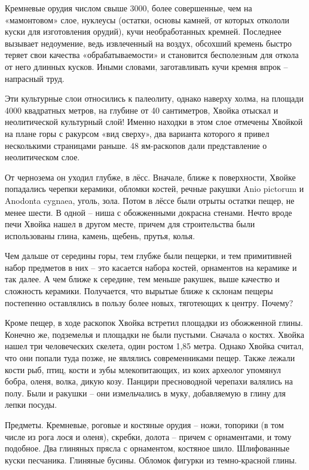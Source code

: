 Кремневые орудия числом свыше 3000, более совершенные, чем на «мамонтовом» слое, нуклеусы (остатки, основы камней, от которых откололи куски для изготовления орудий), кучи необработанных кремней. Последнее вызывает недоумение, ведь извлеченный на воздух, обсохший кремень быстро теряет свои качества «обрабатываемости» и становится бесполезным для откола от него длинных кусков. Иными словами, заготавливать кучи кремня впрок – напрасный труд.

Эти культурные слои относились к палеолиту, однако наверху холма, на площади 4000 квадратных метров, на глубине от 40 сантиметров, Хвойка отыскал и неолитической культурный слой! Именно находки в этом слое отмечены Хвойкой на плане горы с ракурсом «вид сверху», два варианта которого я привел несколькими страницами раньше. 48 ям-раскопов дали представление о неолитическом слое.

От чернозема он уходил глубже, в лёсс. Вначале, ближе к поверхности, Хвойке попадались черепки керамики, обломки костей, речные ракушки Anio pictorum и Anodonta cygnaea, уголь, зола. Потом в лёссе были отрыты остатки пещер, не менее шести. В одной – ниша с обожженными докрасна стенами. Нечто вроде печи Хвойка нашел в другом месте, причем для строительства были использованы глина, камень, щебень, прутья, колья.

Чем дальше от середины горы, тем глубже были пещерки, и тем примитивней набор предметов в них – это касается набора костей, орнаментов на керамике и так далее. А чем ближе к середине, тем меньше ракушек, выше качество и сложность керамики. Получается, что вырытые ближе к склонам пещеры постепенно оставлялись в пользу более новых, тяготеющих к центру. Почему?

Кроме пещер, в ходе раскопок Хвойка встретил площадки из обожженной глины. Конечно же, подземелья и площадки не были пустыми. Сначала о костях. Хвойка нашел три человеческих скелета, один ростом 1,85 метра. Однако Хвойка считал, что они попали туда позже, не являлись современниками пещер. Также лежали кости рыб, птиц, кости и зубы млекопитающих, из коих археолог упомянул бобра, оленя, волка, дикую козу. Панцири пресноводной черепахи валялись на полу. Были и ракушки – они измельчались в муку, добавляемую в глину для лепки посуды.

Предметы. Кремневые, роговые и костяные орудия – ножи, топорики (в том числе из рога лося и оленя), скребки, долота – причем с орнаментами, и тому подобное. Два глиняных прясла с орнаментом, костяное шило. Шлифованные куски песчаника. Глиняные бусины. Обломок фигурки из темно-красной глины.

